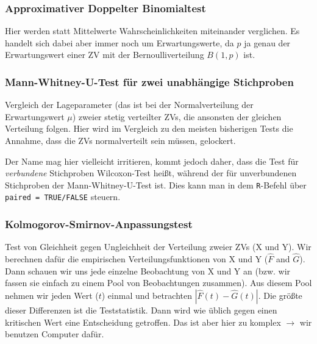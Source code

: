 \documentclass[a4paper]{article}
\newcommand\dangersign{%
 \makebox[1.8em][c]{%
 \makebox[0pt][c]{\raisebox{.15em}{\small!}}%
 \makebox[0pt][c]{\color{red}\Large$\triangle$}}}%
\begin{document}
\noindent {}

\subsubsection{Approximativer Doppelter Binomialtest}\label{sec:bintest2}
Hier werden statt Mittelwerte Wahrscheinlichkeiten miteinander verglichen. Es handelt sich dabei aber immer noch um Erwartungswerte, da $p$ ja genau der Erwartungswert einer ZV mit der Bernoulliverteilung $B(1,p)$ ist.

\subsubsection{Mann-Whitney-U-Test für zwei unabhängige Stichproben}\label{sec:MWUtest}
Vergleich der Lageparameter (das ist bei der Normalverteilung der Erwartungswert $\mu$) zweier stetig verteilter ZVs, die ansonsten der gleichen Verteilung folgen. Hier wird im Vergleich zu den meisten bisherigen Tests die Annahme, dass die ZVs normalverteilt sein müssen, gelockert.\\

\noindent {}

\noindent \dangersign Der Name mag hier vielleicht irritieren, kommt jedoch daher, dass die Test für \textit{verbundene} Stichproben Wilcoxon-Test heißt, während der für unverbundenen Stichproben der Mann-Whitney-U-Test ist. Dies kann man in dem \texttt{R}-Befehl über \texttt{paired = TRUE/FALSE} steuern.

\subsubsection{Kolmogorov-Smirnov-Anpassungstest}\label{sec:KolSmi}
Test von Gleichheit gegen Ungleichheit der Verteilung zweier ZVs (X und Y). Wir berechnen dafür die empirischen Verteilungsfunktionen von X und Y ($\hat{F}$ and $\hat{G}$). Dann schauen wir uns jede einzelne Beobachtung von X und Y an (bzw. wir fassen sie einfach zu einem Pool von Beobachtungen zusammen). Aus diesem Pool nehmen wir jeden Wert ($t$) einmal und betrachten $|\hat{F}(t)-\hat{G}(t)|$. Die größte dieser Differenzen ist die Teststatistik. Dann wird wie üblich gegen einen kritischen Wert eine Entscheidung getroffen. Das ist aber hier zu komplex $\rightarrow$ wir benutzen Computer dafür.\\
\end{document}
